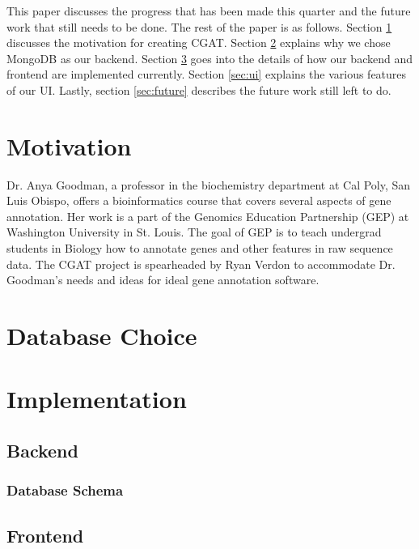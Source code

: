 \documentclass[10pt, conference, compsocconf]{IEEEtran}
\begin{document}
This paper discusses the progress that has been made this quarter and the future work that 
still needs to be done. The rest of the paper is as follows. Section \ref{sec:motive} discusses the
motivation for creating CGAT. Section \ref{sec:choice} explains why we chose MongoDB
as our backend. Section \ref{sec:implementation} goes into the details of how
our backend and frontend are implemented currently. Section \ref{sec:ui} explains the
various features of our UI. Lastly, section \ref{sec:future} describes the future work still left to
do.

\section{Motivation}\label{sec:motive}
Dr. Anya Goodman, a professor in the biochemistry department at Cal Poly, San Luis
Obispo, offers a bioinformatics course that covers several aspects of gene
annotation. Her work is a part of the Genomics Education Partnership (GEP) at 
Washington University in St. Louis.\cite{gep} The goal of GEP is to teach undergrad students
in Biology how to annotate genes and other features in raw sequence data.
The CGAT project is spearheaded by Ryan Verdon to accommodate Dr.
Goodman's needs and ideas for ideal gene annotation software.

\section{Database Choice}\label{sec:choice}

\section{Implementation}\label{sec:implementation}

\subsection{Backend}

\subsubsection{Database Schema}

\subsection{Frontend}
\end{document}

